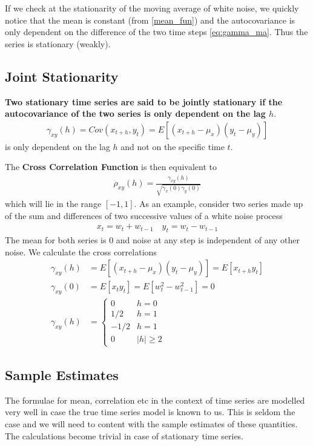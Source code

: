\documentclass[../../time_series_notes.tex]{subfiles}
\begin{document}
If we check at the stationarity of the moving average of white noise, we quickly notice that the mean is constant (from \ref{mean_fun}) and the autocovariance is only dependent on the difference of the two time steps \eqref{eq:gamma_ma}. Thus the series is stationary (weakly).

\subsection{Joint Stationarity}
\textbf{Two stationary time series are said to be jointly stationary if the autocovariance of the two series is only dependent on the lag $h$}.\newline
\begin{align*}
    \gamma_{xy}(h) = Cov(x_{t+h}, y_{t}) = E[(x_{t+h} - \mu_{x})(y_{t} - \mu_{y})]
\end{align*}
is only dependent on the lag $h$ and not on the specific time $t$.\newline

The \textbf{Cross Correlation Function} is then equivalent to
\begin{align*}
    \rho_{xy}(h) = \frac{\gamma_{xy}(h)}{\sqrt{\gamma_{x}(0) \gamma_{y}(0)}}
\end{align*}
which will lie in the range $[-1,1]$. As an example, consider two series made up of the sum and differences of two successive values of a white noise process
\begin{align*}
    x_{t} = w_{t} + w_{t-1} \quad y_{t} = w_{t} - w_{t-1}
\end{align*}
The mean for both series is $0$ and noise at any step is independent of any other noise. We calculate the cross correlations
\begin{align*}
    \gamma_{xy}(h) &= E[(x_{t+h} - \mu_{x})(y_{t} - \mu_{y})] = E[x_{t+h}y_{t}]\\
    \gamma_{xy}(0) &= E[x_{t}y_{t}] = E[w_{t}^{2} - w_{t-1}^{2}] = 0\\
    \gamma_{xy}(h) &= \begin{cases} 0 &\mbox{$h = 0$}\\ 1/2 &\mbox{$h=1$}\\ -1/2 &\mbox{$h=1$}\\ 0 &\mbox{$\lvert h \rvert \geq 2$} \end{cases}
\end{align*}


\subsection{Sample Estimates}
The formulae for mean, correlation etc in the context of time series are modelled very well in case the true time series model is known to us. This is seldom the case and we will need to content with the sample estimates of these quantities. The calculations become trivial in case of stationary time series.
\end{document}
